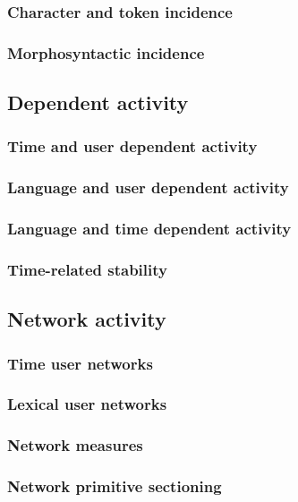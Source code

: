 \documentclass[a4paper, 11pt]{article} %
\begin{document}
\subsubsection{Character and token incidence}
\subsubsection{Morphosyntactic incidence}
\subsection{Dependent activity}
\subsubsection{Time and user dependent activity}
\subsubsection{Language and user dependent activity}
\subsubsection{Language and time dependent activity}
\subsubsection{Time-related stability}
\subsection{Network activity}
\subsubsection{Time user networks}

\subsubsection{Lexical user networks}

\subsubsection{Network measures}

\subsubsection{Network primitive sectioning}
\end{document}
